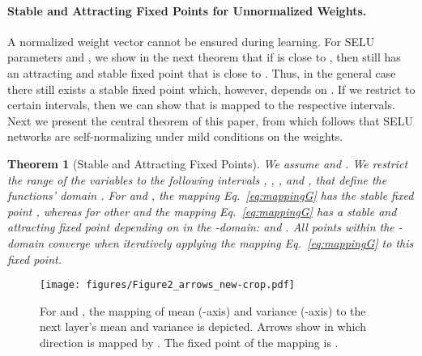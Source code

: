 \documentclass{article}
\newtheorem{theorem}{Theorem}
\begin{document}
\paragraph{Stable and Attracting Fixed Points for Unnormalized Weights.}
A normalized weight vector  cannot be ensured during learning.
For SELU parameters 
 and ,
we show in the next theorem that 
if  is close to , then  still has an
attracting and stable fixed point
that is close to .
Thus, in the general case there still exists a stable fixed point
which, however, depends on .
If we restrict  to certain intervals, then we 
can show that  is mapped to the respective intervals.
Next we present the central theorem of this paper,
from which follows that SELU
networks are self-normalizing under mild conditions on the weights.
\begin{theorem}[Stable and Attracting Fixed Points]
\label{lem:fixedPoint} 
We assume  and .
We restrict the range of the variables to the following intervals
,
,
, and
, 
that define the functions' domain .
For  and , the mapping  Eq.~\eqref{eq:mappingG}
 has the stable
fixed point , whereas for other  and  the mapping  Eq.~\eqref{eq:mappingG}
 has a stable and
attracting fixed point depending on  in the 
-domain:  and 
.
All points within the -domain converge when
iteratively applying the mapping  Eq.~\eqref{eq:mappingG} to this fixed point.
\end{theorem}


\begin{figure}
 \texttt{[image: figures/Figure2\_arrows\_new-crop.pdf]}
 \caption[Visualization of the mapping ]{For  and , 
  the mapping  of mean  (-axis) and variance  (-axis)
  to the next layer's mean  and variance  
  is depicted.
  Arrows show in which direction  is mapped by .
  The fixed point of the mapping  is .
 \label{fig:arrows}}
\end{figure}
\end{document}
